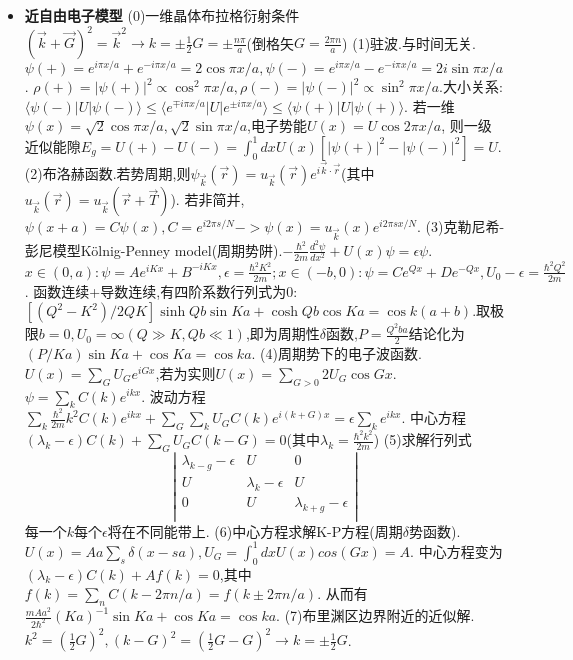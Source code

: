 \documentclass[UTF8,a4paper,1pt,twocolumn]{ctexart}
\begin{document}
\begin{itemize}
  \item \textbf{近自由电子模型}
  (0)一维晶体布拉格衍射条件$(\vec{k}+\vec{G})^2=\vec{k}^2\rightarrow k=\pm\frac{1}{2}G=\pm\frac{n\pi}{a}$(倒格矢$G=\frac{2\pi n}{a}$)
  (1)驻波.与时间无关.$\psi(+)=e^{i\pi x/a}+e^{-i\pi x/a}=2\cos{\pi x/a},\psi(-)=e^{i\pi x/a}-e^{-i\pi x/a}=2i\sin{\pi x/a}$.
  $\rho(+)=|\psi(+)|^2\propto\cos^2{\pi x/a},\rho(-)=|\psi(-)|^2\propto\sin^2{\pi x/a}$.大小关系:$\langle\psi(-)|U|\psi(-)\rangle\leq\langle e^{\mp i\pi x/a}|U|e^{\pm i\pi x/a}\rangle\leq\langle\psi(+)|U|\psi(+)\rangle$.
  若一维$\psi(x)=\sqrt{2}\cos{\pi x/a},\sqrt{2}\sin{\pi x/a}$,电子势能$U(x)=U\cos{2\pi x/a}$,
  则一级近似能隙$E_g=U(+)-U(-)=\int_{0}^{1}dx U(x)[|\psi(+)|^2-|\psi(-)|^2]=U$.
  (2)布洛赫函数.若势周期,则$\psi_{\vec{k}}(\vec{r})=u_{\vec{k}}(\vec{r})e^{i\vec{k}\cdot\vec{r}}$(其中$u_{\vec{k}}(\vec{r})=u_{\vec{k}}(\vec{r}+\vec{T})$).
  若非简并,$\psi(x+a)=C\psi(x),C=e^{i2\pi s/N}->\psi(x)=u_{\vec{k}}(x)e^{i2\pi sx/N}$.
  (3)克勒尼希-彭尼模型Kölnig-Penney model(周期势阱).$-\frac{\hbar^2}{2m}\frac{d^2\psi}{dx^2}+U(x)\psi=\epsilon\psi$.
  $x\in(0,a):\psi=Ae^{iKx}+B^{-iKx},\epsilon=\frac{\hbar^2 K^2}{2m};x\in(-b,0):\psi=Ce^{Qx}+De^{-Qx},U_0-\epsilon=\frac{\hbar^2 Q^2}{2m}$.
  函数连续+导数连续,有四阶系数行列式为0:$[(Q^2-K^2)/2QK]\sinh{Qb}\sin{Ka}+\cosh{Qb}\cos{Ka}=\cos{k(a+b)}$.取极限$b=0,U_0=\infty(Q\gg K,Qb\ll 1)$,即为周期性$\delta$函数,$P=\frac{Q^2ba}{2}$结论化为$(P/Ka)\sin{Ka}+\cos{Ka}=\cos{ka}$.
  (4)周期势下的电子波函数.$U(x)=\sum_{G}U_{G}e^{iGx}$,若为实则$U(x)=\sum_{G>0}2U_G\cos{Gx}$.$\psi=\sum_{k}C(k)e^{ikx}$.
  波动方程$\sum_{k}\frac{\hbar^2}{2m}k^2C(k)e^{ikx}+\sum_{G}\sum_{k}U_G C(k)e^{i(k+G)x}=\epsilon\sum_{k}e^{ikx}$.
  中心方程$(\lambda_k-\epsilon)C(k)+\sum_{G}U_GC(k-G)=0$(其中$\lambda_k=\frac{\hbar^2 k^2}{2m}$)
  (5)求解行列式
  $$
  \left |\begin{array}{ccc}
   \lambda_{k-g}-\epsilon & U & 0  \\
   U & \lambda_{k}-\epsilon & U  \\
   0 & U & \lambda_{k+g}-\epsilon   \\
        \end{array}\right|
  $$
  每一个$k$每个$\epsilon$将在不同能带上.
  (6)中心方程求解K-P方程(周期$\delta$势函数).$U(x)=Aa\sum_{s}\delta(x-sa),U_G=\int_0^{1}dxU(x)cos(Gx)=A.$
  中心方程变为$(\lambda_k-\epsilon)C(k)+Af(k)=0$,其中$f(k)=\sum_{n}C(k-2\pi n/a)=f(k\pm 2\pi n/a)$.
  从而有$\frac{mAa^2}{2\hbar^2}(Ka)^{-1}\sin{Ka}+\cos{Ka}=\cos{ka}$.
  (7)布里渊区边界附近的近似解.
  $k^2=(\frac{1}{2}G)^2,(k-G)^2=(\frac{1}{2}G-G)^2\rightarrow k=\pm\frac{1}{2}G$.

\end{itemize}
\end{document}
